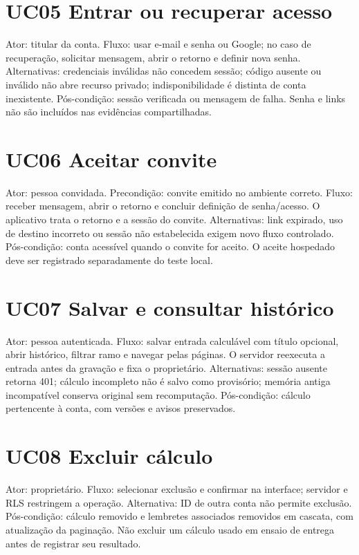 \section{UC05 Entrar ou recuperar acesso}
\label{section-A-5}
Ator: titular da conta. Fluxo: usar e-mail e senha ou Google; no caso de recuperação, solicitar mensagem, abrir o retorno e definir nova senha. Alternativas: credenciais inválidas não concedem sessão; código ausente ou inválido não abre recurso privado; indisponibilidade é distinta de conta inexistente. Pós-condição: sessão verificada ou mensagem de falha. Senha e links não são incluídos nas evidências compartilhadas.

\section{UC06 Aceitar convite}
\label{section-A-6}
Ator: pessoa convidada. Precondição: convite emitido no ambiente correto. Fluxo: receber mensagem, abrir o retorno e concluir definição de senha/acesso. O aplicativo trata o retorno e a sessão do convite. Alternativas: link expirado, uso de destino incorreto ou sessão não estabelecida exigem novo fluxo controlado. Pós-condição: conta acessível quando o convite for aceito. O aceite hospedado deve ser registrado separadamente do teste local.

\section{UC07 Salvar e consultar histórico}
\label{section-A-7}
Ator: pessoa autenticada. Fluxo: salvar entrada calculável com título opcional, abrir histórico, filtrar ramo e navegar pelas páginas. O servidor reexecuta a entrada antes da gravação e fixa o proprietário. Alternativas: sessão ausente retorna 401; cálculo incompleto não é salvo como provisório; memória antiga incompatível conserva original sem recomputação. Pós-condição: cálculo pertencente à conta, com versões e avisos preservados.

\section{UC08 Excluir cálculo}
\label{section-A-8}
Ator: proprietário. Fluxo: selecionar exclusão e confirmar na interface; servidor e RLS restringem a operação. Alternativa: ID de outra conta não permite exclusão. Pós-condição: cálculo removido e lembretes associados removidos em cascata, com atualização da paginação. Não excluir um cálculo usado em ensaio de entrega antes de registrar seu resultado.

